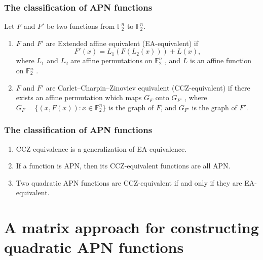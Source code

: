\documentclass[
    aspectratio=169,                   %
]{beamer}
\newcommand{\F}{\mathbb{F}}
\begin{document}
    \begin{frame}
        \frametitle{The classification of APN functions}
    
        \begin{definition}
            Let $F$ and $F'$ be two functions from $\F_2^n$ to $\F_2^n$.
            \begin{enumerate}
                \item $F$ and $F'$ are Extended affine equivalent (EA-equivalent) if
                \[    F'(x)=L_1(F(L_2(x)))+L(x),\]
                where $L_1$ and $ L_2 $ are affine permutations on $\F_2^n$ , 
                and $L$ is an affine function on $\F_2^n$ .
                \item $F$ and $F'$  are Carlet–Charpin–Zinoviev equivalent (CCZ-equivalent) if there exists an
                affine permutation which maps $G_F$ onto $G_{F'}$  , where $G_F = \{(x, F(x)):x \in\F_2^n \}$ is the
                graph of $F$, and $G_{F'}$ is the graph of $F'$.
            \end{enumerate}
        \end{definition}
    \end{frame}
    \begin{frame}
        \frametitle{The classification of APN functions}
    
        \begin{remark}
            \begin{enumerate}
                \item CCZ-equivalence is a generalization of EA-equivalence.
                \item If a function is APN, then its CCZ-equivalent functions are all APN.
                \item Two quadratic APN functions are CCZ-equivalent if and only if they are EA-equivalent.
            \end{enumerate}
        \end{remark}
    
    \end{frame}

\section{A matrix approach for constructing quadratic APN functions}
\end{document}
